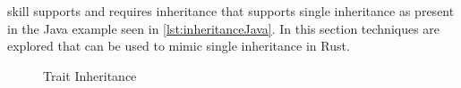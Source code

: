 \documentclass[thesis]{subfiles}
\begin{document}
  \gls{skill} supports and requires inheritance that supports single inheritance\autocite{skill-tr} as present in the Java example seen in \autoref{lst:inheritanceJava}.
  In this section techniques are explored that can be used to mimic single inheritance in Rust.

  \newsavebox{\inheritanceOne}
  \begin{lrbox}{\inheritanceOne}%
    \begin{minipage}{.445\linewidth}
      
    \end{minipage}
  \end{lrbox}

  \newsavebox{\inheritanceTwo}
  \begin{lrbox}{\inheritanceTwo}
    \begin{minipage}{.4825\linewidth}
      
    \end{minipage}
  \end{lrbox}

  \begin{figure}[ht]
    \captionsetup{type=lstlisting}
    \usebox{\inheritanceOne}\hfill
    \usebox{\inheritanceTwo}
    \caption{Trait Inheritance}\label{lst:inheritance}
  \end{figure}
\end{document}
